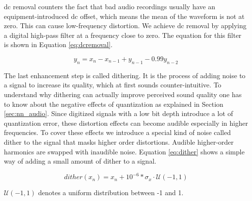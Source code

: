 \gls{dc} removal counters the fact that bad audio recordings usually have an equipment-introduced \gls{dc} offset, which means the mean of the waveform is not at zero. This can cause low-frequency distortion. We achieve \gls{dc} removal by applying a digital high-pass filter at a frequency close to zero. The equation for this filter is shown in Equation \ref{eq:dcremoval}.

\begin{equation}\label{eq:dcremoval}
    y_n = x_n - x_{n-1} + y_{n-1} - 0.99 y_{n-2}
\end{equation}

The last enhancement step is called dithering. It is the process of adding noise to a signal to increase its quality, which at first sounds counter-intuitive. To understand why dithering can actually improve perceived sound quality one has to know about the negative effects of quantization as explained in Section \ref{sec:nn_audio}. Since digitized signals with a low bit depth introduce a lot of quantization error, these distortion effects can become audible especially in higher frequencies. To cover these effects we introduce a special kind of noise called dither to the signal that masks higher order distortions. Audible higher-order harmonics are swapped with inaudible noise. Equation \ref{eq:dither} shows a simple way of adding a small amount of dither to a signal.

\begin{equation}\label{eq:dither}
    dither(x_n) = x_n + 10^{-6} * \sigma_x \cdot \mathcal{U}(-1,1)
\end{equation}

$\mathcal{U}(-1,1)$ denotes a uniform distribution between -1 and 1.